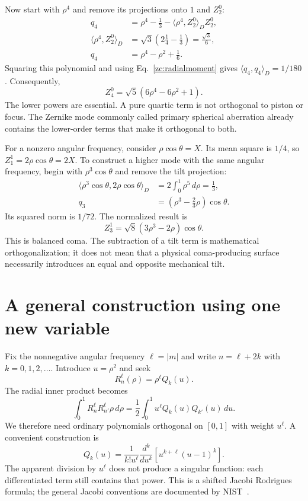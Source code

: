 Now start with $\rho^4$ and remove its projections onto $1$ and $Z_2^0$:
\begin{align}
 q_4&=\rho^4-\frac13
       -\langle\rho^4,Z_2^0\rangle_D Z_2^0,\\
 \langle\rho^4,Z_2^0\rangle_D
   &=\sqrt3\left(2\frac14-\frac13\right)=\frac{\sqrt3}{6},\\
 q_4&=\rho^4-\rho^2+\frac16.
\end{align}
Squaring this polynomial and using Eq.~\eqref{zc:radialmoment} gives
$\langle q_4,q_4\rangle_D=1/180$. Consequently,
\begin{equation}
 Z_4^0=\sqrt5(6\rho^4-6\rho^2+1).
 \label{zc:sphericalpoly}
\end{equation}
The lower powers are essential. A pure quartic term is not orthogonal
to piston or focus. The Zernike mode commonly called primary spherical
aberration already contains the lower-order terms that make it
orthogonal to both.

For a nonzero angular frequency, consider $\rho\cos\theta=X$.
Its mean square is $1/4$, so $Z_1^1=2\rho\cos\theta=2X$.
To construct a higher mode with the same angular frequency, begin with
$\rho^3\cos\theta$ and remove the tilt projection:
\begin{align}
 \langle\rho^3\cos\theta,2\rho\cos\theta\rangle_D
     &=2\int_0^1\rho^5\,d\rho=\frac13,\\
 q_3&=\left(\rho^3-\frac23\rho\right)\cos\theta.
\end{align}
Its squared norm is $1/72$. The normalized result is
\begin{equation}
 Z_3^1=\sqrt8(3\rho^3-2\rho)\cos\theta.
\end{equation}
This is balanced coma. The subtraction of a tilt term is mathematical
orthogonalization; it does not mean that a physical coma-producing
surface necessarily introduces an equal and opposite mechanical tilt.

\section{A general construction using one new variable}
Fix the nonnegative angular frequency $\ell=|m|$ and write
$n=\ell+2k$ with $k=0,1,2,\ldots$. Introduce $u=\rho^2$ and seek
\begin{equation}
 R_n^\ell(\rho)=\rho^\ell Q_k(u).
\end{equation}
The radial inner product becomes
\begin{equation}
 \int_0^1R_n^\ell R_{n'}^\ell\rho\,d\rho
   =\frac12\int_0^1u^\ell Q_k(u)Q_{k'}(u)\,du.
\end{equation}
We therefore need ordinary polynomials orthogonal on $[0,1]$ with
weight $u^\ell$. A convenient construction is
\begin{equation}
 \boxed{Q_k(u)=\frac1{k!u^\ell}
       \frac{d^k}{du^k}\left[u^{k+\ell}(u-1)^k\right].}
 \label{zc:rodrigues}
\end{equation}
The apparent division by $u^\ell$ does not produce a singular function:
each differentiated term still contains that power. This is a shifted
Jacobi Rodrigues formula; the general Jacobi conventions are documented
by NIST~\cite{zc:dlmfRodrigues}.

